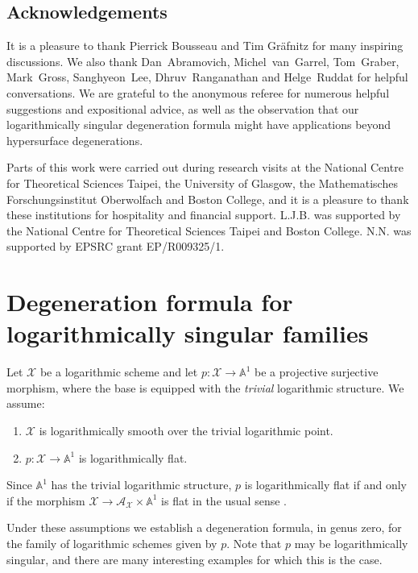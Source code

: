 \documentclass[11pt]{amsart}
\theoremstyle{definition}
\theoremstyle{definition}
\newcommand{\Aaff}{\mathbb{A}}
\newcommand{\Acal}{\mathcal{A}}
\newcommand{\Xcal}{\mathcal{X}}
\begin{document}
\subsection{Acknowledgements} It is a pleasure to thank Pierrick Bousseau and Tim Gr\"afnitz for many inspiring discussions. We also thank Dan~Abramovich, Michel~van~Garrel, Tom~Graber, Mark~Gross, Sanghyeon~Lee, Dhruv~Ranganathan and Helge~Ruddat for helpful conversations. We are grateful to the anonymous referee for numerous helpful suggestions and expositional advice, as well as the observation that our logarithmically singular degeneration formula might have applications beyond hypersurface degenerations.

Parts of this work were carried out during research visits at the National Centre for Theoretical Sciences Taipei, the University of Glasgow, the Mathematisches Forschungsinstitut Oberwolfach and Boston College, and it is a pleasure to thank these institutions for hospitality and financial support. L.J.B. was supported by the National Centre for Theoretical Sciences Taipei and Boston College. N.N. was supported by EPSRC grant EP/R009325/1.


\section{Degeneration formula for logarithmically singular families} \label{section constructing obstruction theory}\label{sec: degeneration formula}

\noindent Let $\Xcal$ be a logarithmic scheme and let $p \colon \Xcal \to \Aaff^{\! 1}$ be a projective surjective morphism, where the base is equipped with the \emph{trivial} logarithmic structure. We assume:
\begin{enumerate}
\item $\Xcal$ is logarithmically smooth over the trivial logarithmic point.
\item $p \colon \Xcal \to \Aaff^{\! 1}$ is logarithmically flat.	
\end{enumerate}
Since $\Aaff^{\! 1}$ has the trivial logarithmic structure, $p$ is logarithmically flat if and only if the morphism $\Xcal \to \Acal_\Xcal \times \Aaff^{\! 1}$ is flat in the usual sense \cite{GillamLogFlat}.

Under these assumptions we establish a degeneration formula, in genus zero, for the family of logarithmic schemes given by $p$. Note that $p$ may be logarithmically singular, and there are many interesting examples for which this is the case.
\end{document}
